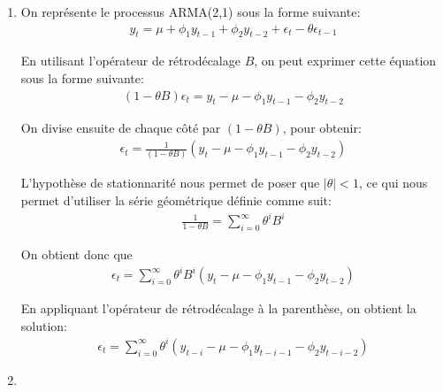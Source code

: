 \begin{solution}{2.7}
  \begin{enumerate}
\item
  On représente le processus ARMA(2,1) sous la forme suivante:
  \begin{align*}
    y_t = \mu + \phi_1 y_{t-1} + \phi_2 y_{t-2} + \epsilon_t - \theta\epsilon_{t-1}
  \end{align*}

  En utilisant l'opérateur de rétrodécalage $B$, on peut exprimer cette équation sous la forme suivante:
  \begin{align*}
    (1-\theta B)\epsilon_t = y_t - \mu - \phi_1 y_{t-1} - \phi_2 y_{t-2}
  \end{align*}

  On divise ensuite de chaque côté par $(1-\theta B)$, pour obtenir:
  \begin{align*}
    \epsilon_t = \frac{1}{(1-\theta B)} \left(y_t - \mu - \phi_1 y_{t-1} - \phi_2 y_{t-2}\right)
  \end{align*}

  L'hypothèse de stationnarité nous permet de poser que $| \theta | < 1$, ce qui nous permet d'utiliser la série géométrique définie comme suit:
  \begin{align*}
    \frac{1}{1-\theta B} = \sum_{i=0}^{\infty} \theta^i B^i
  \end{align*}

  On obtient donc que
  \begin{align*}
    \epsilon_t = \sum_{i=0}^{\infty} \theta^i B^i \left(y_t - \mu - \phi_1 y_{t-1} - \phi_2 y_{t-2}\right)
  \end{align*}

  En appliquant l'opérateur de rétrodécalage à la parenthèse, on obtient la solution:
  \begin{align*}
    \epsilon_t = \sum_{i=0}^{\infty} \theta^i \left(y_{t-i} - \mu - \phi_1 y_{t-i-1} - \phi_2 y_{t-i-2} \right)
  \end{align*}

\item


\end{enumerate}
\end{solution}
